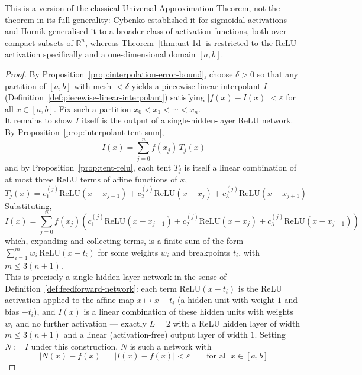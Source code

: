 		This is a version of the classical Universal Approximation Theorem, not the theorem in its full generality: Cybenko \citep{Cybenko1989} established it for sigmoidal activations and Hornik \citep{Hornik1991} generalised it to a broader class of activation functions, both over compact subsets of $\mathbb{R}^n$, whereas Theorem~\ref{thm:uat-1d} is restricted to the ReLU activation specifically and a one-dimensional domain $[a,b]$.
		
		\begin{proof}
			
			By Proposition~\ref{prop:interpolation-error-bound}, choose $\delta>0$ so that any partition of $[a,b]$ with mesh $<\delta$ yields a piecewise-linear interpolant $I$ (Definition~\ref{def:piecewise-linear-interpolant}) satisfying $|f(x)-I(x)|<\varepsilon$ for all $x\in[a,b]$. Fix such a partition $x_0<x_1<\cdots<x_n$. \\
			
			It remains to show $I$ itself is the output of a single-hidden-layer ReLU network. By Proposition~\ref{prop:interpolant-tent-sum},
			\[
				I(x) = \sum_{j=0}^n f(x_j)\,T_j(x)
			\]
			and by Proposition~\ref{prop:tent-relu}, each tent $T_j$ is itself a linear combination of at most three ReLU terms of affine functions of $x$,
			\[
				T_j(x) = c_1^{(j)}\mathrm{ReLU}(x-x_{j-1}) + c_2^{(j)}\mathrm{ReLU}(x-x_j) + c_3^{(j)}\mathrm{ReLU}(x-x_{j+1})
			\]
			Substituting,
			\[
				I(x) = \sum_{j=0}^n f(x_j)\left(c_1^{(j)}\mathrm{ReLU}(x-x_{j-1}) + c_2^{(j)}\mathrm{ReLU}(x-x_j) + c_3^{(j)}\mathrm{ReLU}(x-x_{j+1})\right)
			\]
			which, expanding and collecting terms, is a finite sum of the form $\sum_{i=1}^{m} w_i\,\mathrm{ReLU}(x - t_i)$ for some weights $w_i$ and breakpoints $t_i$, with $m \le 3(n+1)$. \\
			
			This is precisely a single-hidden-layer network in the sense of Definition~\ref{def:feedforward-network}: each term $\mathrm{ReLU}(x-t_i)$ is the ReLU activation applied to the affine map $x\mapsto x-t_i$ (a hidden unit with weight $1$ and bias $-t_i$), and $I(x)$ is a linear combination of these hidden units with weights $w_i$ and no further activation — exactly $L=2$ with a ReLU hidden layer of width $m\le3(n+1)$ and a linear (activation-free) output layer of width $1$. Setting $N:=I$ under this construction, $N$ is such a network with
			\[
				|N(x)-f(x)| = |I(x)-f(x)| < \varepsilon \qquad \text{for all } x\in[a,b]
			\]
		\end{proof}
		
